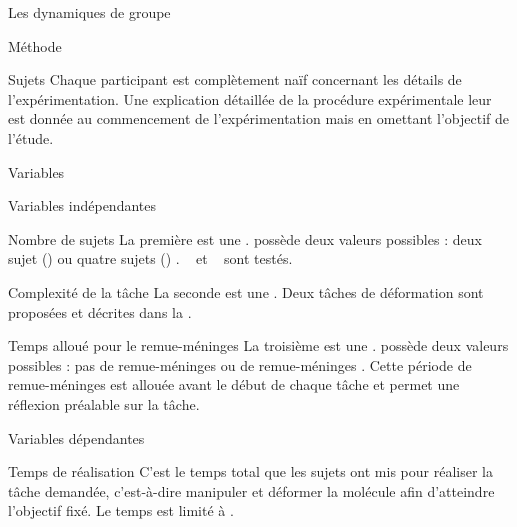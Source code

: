 \documentclass[myfrancais]{mythesis}
\begin{document}
\begin{mychapter}{Les dynamiques de groupe}
\begin{mysection}{Méthode}
\begin{mysubsection}{Sujets}
				Chaque participant est complètement naïf concernant les détails de l'expérimentation.
				Une explication détaillée de la procédure expérimentale leur est donnée au commencement de l'expérimentation mais en omettant l'objectif de l'étude.
			\end{mysubsection}
			\begin{mysubsection}{Variables}
				\begin{mysubsubsection}{Variables indépendantes}
					\begin{myparagraph}{ Nombre de sujets}
						La première  est une .
						 possède deux valeurs possibles : \og deux sujet (\mycf {}) \fg ou \og quatre sujets (\mycf {}) \fg.
						~ et ~ sont testés.
					\end{myparagraph}
					\begin{myparagraph}{ Complexité de la tâche}
						La seconde  est une .
						Deux tâches de déformation sont proposées et décrites dans la .
					\end{myparagraph}
					\begin{myparagraph}{ Temps alloué pour le remue-méninges}
						La troisième  est une .
						 possède deux valeurs possibles : \og pas de remue-méninges \fg ou \og {} de remue-méninges \fg.
						Cette période de remue-méninges est allouée avant le début de chaque tâche et permet une réflexion préalable sur la tâche.
					\end{myparagraph}
				\end{mysubsubsection}
				\begin{mysubsubsection}{Variables dépendantes}
					\begin{myparagraph}{ Temps de réalisation}
						C'est le temps total que les sujets ont mis pour réaliser la tâche demandée, c'est-à-dire manipuler et déformer la molécule afin d'atteindre l'objectif fixé.
						Le temps est limité à .
					\end{myparagraph}

\end{mysubsubsection}
\end{mysubsection}
\end{mysection}
\end{mychapter}
\end{document}

